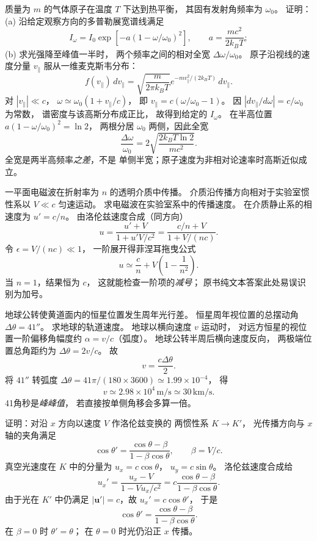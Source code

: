 质量为 $m$ 的气体原子在温度 $T$ 下达到热平衡，
其固有发射角频率为 $\omega_0$。
证明：(a) 沿给定观察方向的多普勒展宽谱线满足
\[
 I_\omega=I_0\exp[-a(1-\omega/\omega_0)^2],
 \qquad a=\frac{mc^2}{2k_BT};
\]
(b) 求光强降至峰值一半时，
两个频率之间的相对全宽 $\Delta\omega/\omega_0$。
\exsolution
原子沿视线的速度分量
$v_\parallel$ 服从一维麦克斯韦分布：
\[
 f(v_\parallel)\,dv_\parallel=
 \sqrt{\frac{m}{2\pi k_BT}}
 e^{-mv_\parallel^2/(2k_BT)}\,dv_\parallel.
\]
对 $|v_\parallel|\ll c$，
$\omega\simeq\omega_0(1+v_\parallel/c)$，
即 $v_\parallel=c(\omega/\omega_0-1)$。
因 $|dv_\parallel/d\omega|=c/\omega_0$ 为常数，
谱密度与该高斯分布成正比，
故得到给定的 $I_\omega$。
在半高位置
$a(1-\omega/\omega_0)^2=\ln2$，
两根分居 $\omega_0$ 两侧，因此全宽
\[
 \boxed{\frac{\Delta\omega}{\omega_0}
 =2\sqrt{\frac{2k_BT\ln2}{mc^2}}}.
\]
\excheck 全宽是两半高频率\emph{之差}，不是
单侧半宽；原子速度为非相对论速率时高斯近似成立。

一平面电磁波在折射率为 $n$ 的透明介质中传播。
介质沿传播方向相对于实验室惯性系以
$V\ll c$ 匀速运动。
求电磁波在实验室系中的传播速度。
\exsolution
在介质静止系的相速度为 $u'=c/n$。
由洛伦兹速度合成（同方向）
\[
 u=\frac{u'+V}{1+u'V/c^2}
 =\boxed{\frac{c/n+V}{1+V/(nc)}}.
\]
令 $\epsilon=V/(nc)\ll1$，
一阶展开得菲涅耳拖曳公式
\[
 \boxed{u\simeq\frac cn+
 V\left(1-\frac1{n^2}\right)}.
\]
\excheck 当 $n=1$，结果恒为 $c$，
这就能检查一阶项的\emph{减号}；
原书纯文本答案此处易误识别为加号。

地球公转使黄道面内的恒星位置发生周年光行差。
恒星周年视位置的总摆动角
$\Delta\theta=41''$。
求地球的轨道速度。
\exsolution
地球以横向速度 $v$ 运动时，
对远方恒星的视位置一阶偏移角幅度约
$\alpha=v/c$（弧度）。
地球公转半周后横向速度反向，
两极端位置总角距约为
$\Delta\theta=2v/c$。
故
\[
 \boxed{v=\frac{c\Delta\theta}{2}}.
\]
将 $41''$ 转弧度
$\Delta\theta=41\pi/(180\times3600)
\simeq1.99\times10^{-4}$，
得
\[
 \boxed{v\simeq2.98\times10^4\,\mathrm{m/s}
 \simeq30\,\mathrm{km/s}}.
\]
\excheck 41角秒是\emph{峰峰值}，
若直接按单侧角移会多算一倍。

证明：对沿 $x$ 方向以速度 $V$ 作洛伦兹变换的
两惯性系 $K\to K'$，
光传播方向与 $x$ 轴的夹角满足
\[
 \cos\theta'=\frac{\cos\theta-\beta}
 {1-\beta\cos\theta},
 \qquad \beta=V/c.
\]
\exsolution
真空光速度在 $K$ 中的分量为
$u_x=c\cos\theta$，
$u_y=c\sin\theta$。
洛伦兹速度合成给
\[
 u_x'=\frac{u_x-V}{1-Vu_x/c^2}
 =c\frac{\cos\theta-\beta}
 {1-\beta\cos\theta}.
\]
由于光在 $K'$ 中仍满足
$|\bm u'|=c$，故 $u_x'=c\cos\theta'$，
于是
\[
 \boxed{\cos\theta'=
 \frac{\cos\theta-\beta}{1-\beta\cos\theta}}.
\]
\excheck 在 $\beta=0$ 时 $\theta'=\theta$；
在 $\theta=0$ 时光仍沿正 $x$ 传播。

